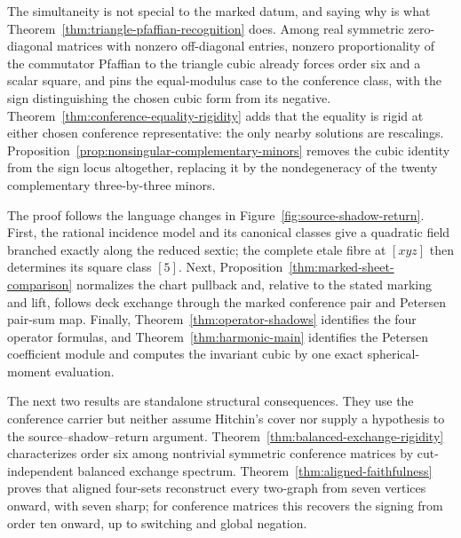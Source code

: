The simultaneity is not special to the marked datum, and saying why is what
Theorem~\ref{thm:triangle-pfaffian-recognition} does.  Among real symmetric
zero-diagonal matrices with nonzero off-diagonal entries, nonzero
proportionality of the commutator Pfaffian to the triangle cubic already
forces order six and a
scalar square, and pins the equal-modulus case to the conference class, with
the sign distinguishing the chosen cubic form from its negative.
Theorem~\ref{thm:conference-equality-rigidity}
adds that the equality is rigid at either chosen conference representative: the
only nearby solutions are rescalings.
Proposition~\ref{prop:nonsingular-complementary-minors} removes the cubic
identity from the sign locus altogether, replacing it by the nondegeneracy of
the twenty complementary three-by-three minors.

The proof follows the language changes in
Figure~\ref{fig:source-shadow-return}.  First, the rational incidence model and
its canonical classes give a quadratic field branched exactly along the
reduced sextic; the complete etale fibre at \([xyz]\) then determines its
square class \([5]\).  Next, Proposition~\ref{thm:marked-sheet-comparison}
normalizes the chart pullback and, relative to the stated marking and lift,
follows deck exchange through the marked conference pair and Petersen
pair-sum map.  Finally, Theorem~\ref{thm:operator-shadows} identifies the four
operator formulas, and Theorem~\ref{thm:harmonic-main} identifies the Petersen
coefficient module and computes the invariant cubic by one exact
spherical-moment evaluation.

The next two results are standalone structural consequences.  They use the
conference carrier but neither assume Hitchin's cover nor supply a hypothesis
to the source--shadow--return argument.
Theorem~\ref{thm:balanced-exchange-rigidity} characterizes order six among
nontrivial symmetric conference matrices by cut-independent balanced exchange
spectrum.
Theorem~\ref{thm:aligned-faithfulness} proves that aligned four-sets reconstruct
every two-graph from seven vertices onward, with seven sharp; for conference
matrices this recovers the signing from order ten onward, up to switching and
global negation.

